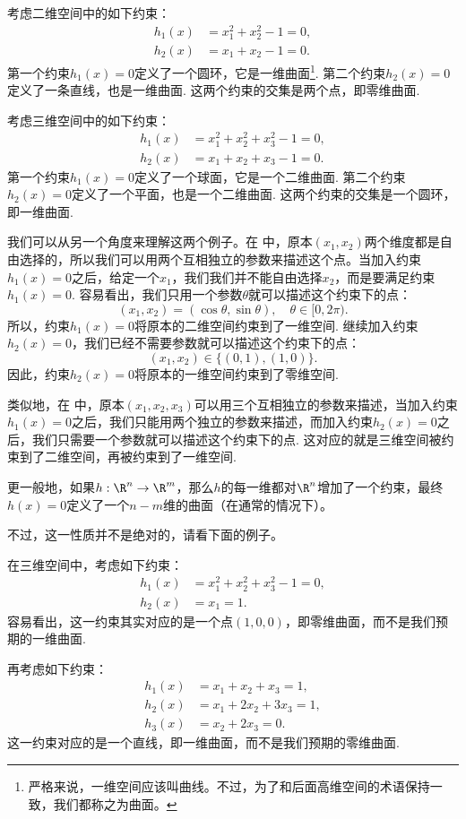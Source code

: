 \begin{example}[二维空间中的约束]\label{ex:2d-constraint}
考虑二维空间中的如下约束：
\begin{align*}
    h_1(x)&=x_1^2+x_2^2-1=0,\\
    h_2(x)&=x_1+x_2-1=0.
\end{align*}
第一个约束$h_1(x)=0$定义了一个圆环，它是一维曲面\footnote{严格来说，一维空间应该叫曲线。不过，为了和后面高维空间的术语保持一致，我们都称之为曲面。}. 第二个约束$h_2(x)=0$定义了一条直线，也是一维曲面. 这两个约束的交集是两个点，即零维曲面.
\end{example}

\begin{example}[三维空间中的约束]\label{ex:3d-constraint}
考虑三维空间中的如下约束：
\begin{align*}
    h_1(x)&=x_1^2+x_2^2+x_3^2-1=0,\\
    h_2(x)&=x_1+x_2+x_3-1=0.
\end{align*}
第一个约束$h_1(x)=0$定义了一个球面，它是一个二维曲面. 第二个约束$h_2(x)=0$定义了一个平面，也是一个二维曲面. 这两个约束的交集是一个圆环，即一维曲面.
\end{example}

我们可以从另一个角度来理解这两个例子。在 中，原本$(x_1,x_2)$两个维度都是自由选择的，所以我们可以用两个互相独立的参数来描述这个点。当加入约束$h_1(x)=0$之后，给定一个$x_1$，我们我们并不能自由选择$x_2$，而是要满足约束$h_1(x)=0$. 容易看出，我们只用一个参数$\theta$就可以描述这个约束下的点：
\[
(x_1,x_2)=(\cos\theta,\sin\theta),\quad \theta\in[0,2\pi).
\]
所以，约束$h_1(x)=0$将原本的二维空间约束到了一维空间. 继续加入约束$h_2(x)=0$，我们已经不需要参数就可以描述这个约束下的点：
\[
(x_1,x_2)\in\{(0,1),(1,0)\}.
\]
因此，约束$h_2(x)=0$将原本的一维空间约束到了零维空间.

类似地，在 中，原本$(x_1,x_2,x_3)$可以用三个互相独立的参数来描述，当加入约束$h_1(x)=0$之后，我们只能用两个独立的参数来描述，而加入约束$h_2(x)=0$之后，我们只需要一个参数就可以描述这个约束下的点. 这对应的就是三维空间被约束到了二维空间，再被约束到了一维空间.

更一般地，如果$h:\R^n\to\R^m$，那么$h$的每一维都对$\R^n$增加了一个约束，最终$h(x)=0$定义了一个$n-m$维的曲面（在通常的情况下）。

不过，这一性质并不是绝对的，请看下面的例子。

\begin{example}\label{ex:3d-constraint-2}
在三维空间中，考虑如下约束：
\begin{align*}
    h_1(x)&=x_1^2+x_2^2+x_3^2-1=0,\\
    h_2(x)&=x_1=1.
\end{align*}
容易看出，这一约束其实对应的是一个点$(1,0,0)$，即零维曲面，而不是我们预期的一维曲面.

再考虑如下约束：
\begin{align*}
    h_1(x)&=x_1+x_2+x_3=1,\\
    h_2(x)&=x_1+2x_2+3x_3=1,\\
    h_3(x)&=x_2+2x_3=0.
\end{align*}
这一约束对应的是一个直线，即一维曲面，而不是我们预期的零维曲面.
\end{example}

